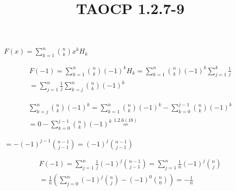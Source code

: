 \documentclass{article}
\title{TAOCP 1.2.7\mbox{-}9}
\begin{document}
\maketitle

\( F(x) = \sum_{k=1}^{n} \binom{n}{k} x^{k}H_{k} \)

\begin{multline*}
F(-1) = \sum_{k=1}^{n} \binom{n}{k} {(-1)}^{k} H_{k} = \sum_{k=1}^{n} \binom{n}{k} {(-1)}^{k} \sum_{j=1}^{k} \frac{1}{j} \\
= \sum_{j=1}^{n} \frac{1}{j} \sum_{k=j}^{n} \binom{n}{k} {(-1)}^{k}
\end{multline*}

\begin{multline*}
\sum_{k=j}^{n} \binom{n}{k} {(-1)}^{k} = \sum_{k=1}^{n} \binom{n}{k} {(-1)}^{k} - \sum_{k=0}^{j-1} \binom{n}{k} {(-1)}^{k} \\
= 0 - \sum_{k=0}^{j-1} \binom{n}{k} {(-1)}^{k} \overset{1.2.6(18)}{=}
\end{multline*}

\( = -{(-1)}^{j-1} \binom{n-1}{j-1} = {(-1)}^{j} \binom{n-1}{j-1} \)

\begin{multline*}
F(-1) = \sum_{j=1}^{n} \frac{1}{j} {(-1)}^{j} \binom{n-1}{j-1} = \sum_{j=1}^{n} \frac{1}{n} {(-1)}^{j} \binom{n}{j} \\
= \frac{1}{n} (\sum_{j=0}^{n} {(-1)}^{j} \binom{n}{j} - {(-1)}^{0}\binom{n}{0}) = -\frac{1}{n}
\end{multline*}
\end{document}
